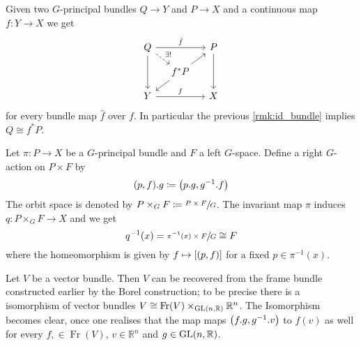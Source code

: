 \begin{remark}
	Given two $G$-principal bundles $Q \to Y$ and $P \to X$ and a continuous map $f \colon Y \to X$ we get 
	\[
		\begin{tikzcd}[sep=small]
			Q \ar[rr,"\hat{f}"]  \ar[dd] \drar[dashed,"\exists!"] & & P \ar[dd] \\
			& f^* P \urar \dlar & \\
			Y \ar[rr,"f"] & & X
		\end{tikzcd}
	\]
	for every bundle map $\hat{f}$ over $f$.
	In particular the previous \autoref{rmk:id_bundle} implies $Q \cong f^* P$.
\end{remark}

\begin{definition}[{name={Borel construction}}]
	Let $\pi \colon P \to X$ be a $G$-principal bundle and $F$ a left $G$-space.
	Define a right $G$-action on $P \times F$ by
	\[
		(p,f) .g \coloneqq \enbrace*{p.g, g^{-1}.f}
	\]
	The orbit space is denoted by $P \times_G F \coloneqq \sfrac{P \times F}{G}$.
	The invariant map $\pi$ induces $q \colon P \times_G F \to X$ and we get
	\[
		q^{-1}(x) = \sfrac{\pi^{-1}(x) \times F}{G} \cong F
	\]
	where the homeomorphism is given by $f \mapsto \benbrace*{(p,f)}$ for a fixed $p \in \pi^{-1}(x)$.
\end{definition}

\begin{example}
	Let $V$ be a vector bundle.
	Then $V$ can be recovered from the frame bundle constructed earlier by the Borel construction; to be precise there is a isomorphism of vector bundles $V \cong \operatorname{Fr}(V) \times_{\GL(n,\mathbb{R})} \mathbb{R}^n$.
	The Isomorphism becomes clear, once one realises that the map
	maps $\enbrace*{f.g, g^{-1}. v}$ to $f(v)$ as well for every $f, \in \operatorname{Fr}(V)$, $v \in \mathbb{R}^n$ and $g \in \GL(n,\mathbb{R})$.
\end{example}









